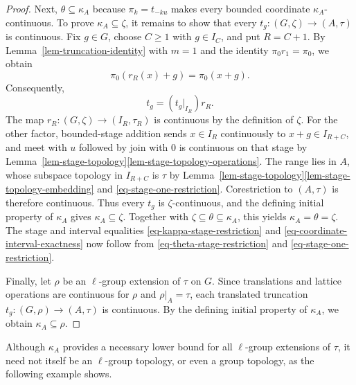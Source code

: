 \documentclass[preprint,3p]{elsarticle}
\theoremstyle{plain}
\theoremstyle{definition}
\numberwithin{equation}{section}
\begin{document}
\begin{proof}
Next, $\theta\subseteq\kappa_A$ because
$\pi_k=t_{-ku}$ makes every bounded coordinate $\kappa_A$-continuous.
To prove $\kappa_A\subseteq\zeta$, it remains to show that every
$t_g\colon(G,\zeta)\longrightarrow(A,\tau)$ is continuous.
Fix $g\in G$, choose $C\geq1$ with $g\in I_C$, and put $R=C+1$.
By Lemma~\ref{lem-truncation-identity} with $m=1$ and the identity
$\pi_0r_1=\pi_0$, we obtain
\[
 \pi_0(r_R(x)+g)=\pi_0(x+g).
\]
Consequently,
\begin{equation}
\label{eq-translated-truncation-factorization}
 t_g=(t_g|_{I_R})r_R.
\end{equation}
The map $r_R\colon(G,\zeta)\longrightarrow(I_R,\tau_R)$
is continuous by the definition of $\zeta$.
For the other factor, bounded-stage addition sends $x\in I_R$
continuously to $x+g\in I_{R+C}$, and meet with $u$ followed by join
with $0$ is continuous on that stage by
Lemma~\ref{lem-stage-topology}\ref{lem-stage-topology-operations}.
The range lies in $A$, whose subspace topology in $I_{R+C}$ is $\tau$
by Lemma~\ref{lem-stage-topology}\ref{lem-stage-topology-embedding}
and \eqref{eq-stage-one-restriction}.
Corestriction to $(A,\tau)$ is therefore continuous.
Thus every $t_g$ is $\zeta$-continuous, and the defining initial
property of $\kappa_A$ gives $\kappa_A\subseteq\zeta$.
Together with $\zeta\subseteq\theta\subseteq\kappa_A$, this yields
$\kappa_A=\theta=\zeta$.
The stage and interval equalities
\eqref{eq-kappa-stage-restriction} and \eqref{eq-coordinate-interval-exactness}
now follow from \eqref{eq-theta-stage-restriction} and
\eqref{eq-stage-one-restriction}.

Finally, let $\rho$ be an $\ell$-group extension
of $\tau$ on $G$.  Since translations and lattice operations
are continuous for $\rho$ and $\rho|_A=\tau$, each translated
truncation $t_g\colon(G,\rho)\longrightarrow(A,\tau)$
is continuous.  By the defining initial property of $\kappa_A$,
we obtain $\kappa_A\subseteq\rho$.
\end{proof}

Although $\kappa_A$ provides a necessary lower bound for all
$\ell$-group extensions of $\tau$, it need not itself be an
$\ell$-group topology, or even a group topology,
as the following example shows.
\end{document}
